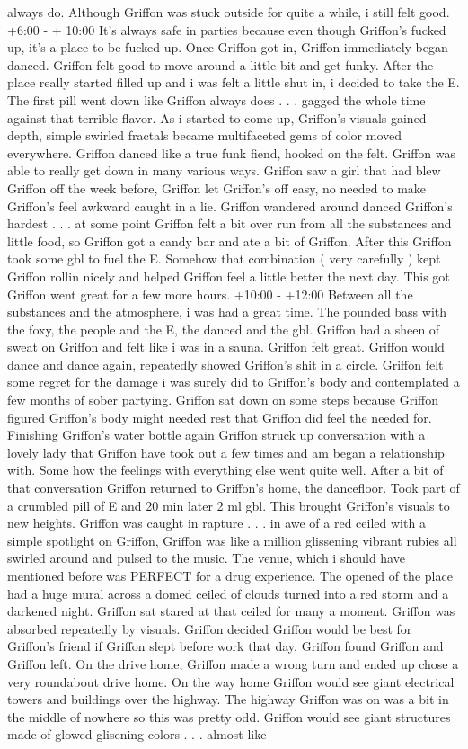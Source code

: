 \documentclass[12pt]{book}
\begin{document}
always do. Although Griffon was stuck outside for quite a while, i still felt good. +6:00 - + 10:00 It's always safe in parties because even though Griffon's fucked up, it's a place to be fucked up. Once Griffon got in, Griffon immediately began danced. Griffon felt good to move around a little bit and get funky. After the place really started filled up and i was felt a little shut in, i decided to take the E. The first pill went down like Griffon always does . . .  gagged the whole time against that terrible flavor. As i started to come up, Griffon's visuals gained depth, simple swirled fractals became multifaceted gems of color moved everywhere. Griffon danced like a true funk fiend, hooked on the felt. Griffon was able to really get down in many various ways. Griffon saw a girl that had blew Griffon off the week before, Griffon let Griffon's off easy, no needed to make Griffon's feel awkward caught in a lie. Griffon wandered around danced Griffon's hardest . . .  at some point Griffon felt a bit over run from all the substances and little food, so Griffon got a candy bar and ate a bit of Griffon. After this Griffon took some gbl to fuel the E. Somehow that combination ( very carefully ) kept Griffon rollin nicely and helped Griffon feel a little better the next day. This got Griffon went great for a few more hours. +10:00 - +12:00 Between all the substances and the atmosphere, i was had a great time. The pounded bass with the foxy, the people and the E, the danced and the gbl. Griffon had a sheen of sweat on Griffon and felt like i was in a sauna. Griffon felt great. Griffon would dance and dance again, repeatedly showed Griffon's shit in a circle. Griffon felt some regret for the damage i was surely did to Griffon's body and contemplated a few months of sober partying. Griffon sat down on some steps because Griffon figured Griffon's body might needed rest that Griffon did feel the needed for. Finishing Griffon's water bottle again Griffon struck up conversation with a lovely lady that Griffon have took out a few times and am began a relationship with. Some how the feelings with everything else went quite well. After a bit of that conversation Griffon returned to Griffon's home, the dancefloor. Took part of a crumbled pill of E and 20 min later 2 ml gbl. This brought Griffon's visuals to new heights. Griffon was caught in rapture . . .  in awe of a red ceiled with a simple spotlight on Griffon, Griffon was like a million glissening vibrant rubies all swirled around and pulsed to the music. The venue, which i should have mentioned before was PERFECT for a drug experience. The opened of the place had a huge mural across a domed ceiled of clouds turned into a red storm and a darkened night. Griffon sat stared at that ceiled for many a moment. Griffon was absorbed repeatedly by visuals. Griffon decided Griffon would be best for Griffon's friend if Griffon slept before work that day. Griffon found Griffon and Griffon left. On the drive home, Griffon made a wrong turn and ended up chose a very roundabout drive home. On the way home Griffon would see giant electrical towers and buildings over the highway. The highway Griffon was on was a bit in the middle of nowhere so this was pretty odd. Griffon would see giant structures made of glowed glisening colors . . .  almost like 
\end{document}
